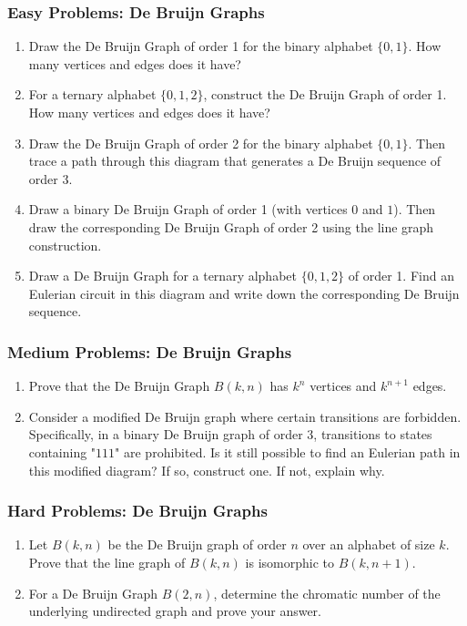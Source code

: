 \documentclass{article}
\theoremstyle{definition}
\begin{document}
\subsubsection{Easy Problems: De Bruijn Graphs}
\begin{enumerate}[resume]
    \item Draw the De Bruijn Graph of order 1 for the binary alphabet $\{0,1\}$. How many vertices and edges does it have?
    
    \item For a ternary alphabet $\{0,1,2\}$, construct the De Bruijn Graph of order 1. How many vertices and edges does it have?
    \item Draw the De Bruijn Graph of order 2 for the binary alphabet $\{0,1\}$. Then trace a path through this diagram that generates a De Bruijn sequence of order 3.
    
    \item Draw a binary De Bruijn Graph of order 1 (with vertices $0$ and $1$). Then draw the corresponding De Bruijn Graph of order 2 using the line graph construction.
    
    \item Draw a De Bruijn Graph for a ternary alphabet $\{0,1,2\}$ of order 1. Find an Eulerian circuit in this diagram and write down the corresponding De Bruijn sequence.
\end{enumerate}

\subsubsection{Medium Problems: De Bruijn Graphs}
\begin{enumerate}[resume]
    \item Prove that the De Bruijn Graph $B(k,n)$ has $k^n$ vertices and $k^{n+1}$ edges.
    
    \item Consider a modified De Bruijn graph where certain transitions are forbidden. Specifically, in a binary De Bruijn graph of order 3, transitions to states containing "$111$" are prohibited. Is it still possible to find an Eulerian path in this modified diagram? If so, construct one. If not, explain why.
\end{enumerate}

\subsubsection{Hard Problems: De Bruijn Graphs}
\begin{enumerate}[resume]
    \item Let $B(k,n)$ be the De Bruijn graph of order $n$ over an alphabet of size $k$. Prove that the line graph of $B(k,n)$ is isomorphic to $B(k,n+1)$.
    
    \item For a De Bruijn Graph $B(2,n)$, determine the chromatic number of the underlying undirected graph and prove your answer.
\end{enumerate}
\end{document}
